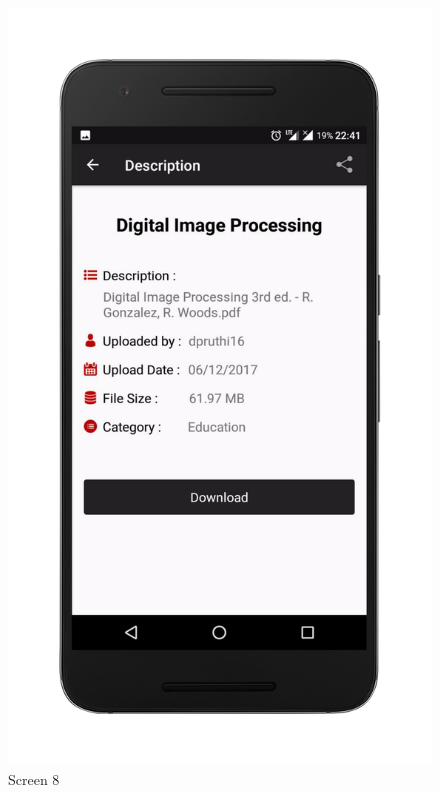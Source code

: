 \begin{figure}[ht]
\centering
\includegraphics[scale=0.13]{images/de.png}
\caption{Screen 8}
\end{figure}

\newpage

